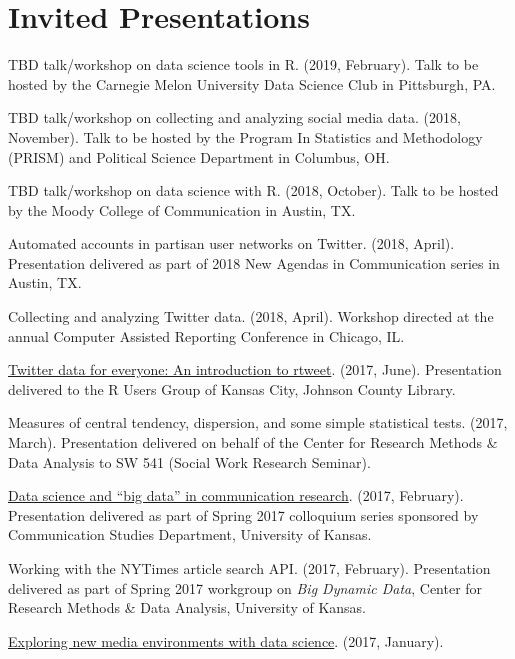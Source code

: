 \section{Invited Presentations}
  \begin{bibenum}
    \item[] TBD talk/workshop on data science tools in R. (2019, February).
      Talk to be hosted by the Carnegie Melon University Data Science Club in Pittsburgh, PA.
    \item[] TBD talk/workshop on collecting and analyzing social media data. (2018, November).
      Talk to be hosted by the Program In Statistics and Methodology (PRISM) and Political Science Department in Columbus, OH.
    \item[] TBD talk/workshop on data science with R. (2018, October).
      Talk to be hosted by the Moody College of Communication in Austin, TX.
    \item[] Automated accounts in partisan user networks on Twitter. (2018, April).
      Presentation delivered as part of 2018 New Agendas in Communication series in Austin, TX.
    \item[] Collecting and analyzing Twitter data. (2018, April).
      Workshop directed at the annual Computer Assisted Reporting Conference in Chicago, IL.
    \item[] \href{https://mkearney.github.io/rusersKC}{Twitter data for everyone: An introduction to rtweet}. (2017, June).
      Presentation delivered to the R Users Group of Kansas City, Johnson County Library.
    \item[] Measures of central tendency, dispersion, and some simple statistical tests. (2017, March).
      Presentation delivered on behalf of the Center for Research Methods \& Data Analysis to SW 541 (Social Work Research Seminar).
    \item[]
      \href{https://mkearney.github.io/COLLOQUIUM/slides.html}{Data science and ``big data'' in communication research}. (2017, February).
      Presentation delivered as part of Spring 2017 colloquium series sponsored by Communication Studies Department, University of Kansas.
    \item[] Working with the NYTimes article search API. (2017, February).
      Presentation delivered as part of Spring 2017 workgroup on \textit{Big Dynamic Data},
      Center for Research Methods \& Data Analysis, University of Kansas.
    \item[]
      \href{https://mkearney.github.io/research_talk/pewtalk.html}{Exploring new media environments with data science}. (2017, January).

\end{bibenum}
